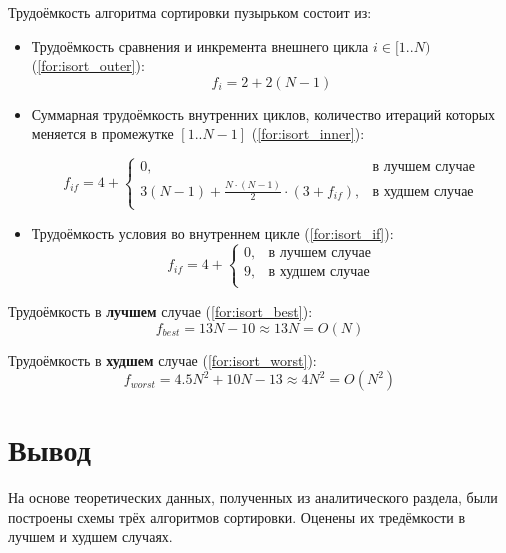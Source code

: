 \documentclass[12pt]{report}
\begin{document}
Трудоёмкость алгоритма сортировки пузырьком состоит из:
\begin{itemize}
	\item Трудоёмкость сравнения и инкремента внешнего цикла $i \in [1..N)$ (\ref{for:isort_outer}):
	\begin{equation}
	\label{for:isort_outer}
	f_{i} = 2 + 2(N - 1)
	\end{equation}
	\item Суммарная трудоёмкость внутренних циклов, количество итераций которых меняется в промежутке $[1..N-1]$ (\ref{for:isort_inner}):

	\begin{equation}
	\label{for:isort_inner}
	f_{if} = 4 + \begin{cases}
		0, & \text{в лучшем случае}\\
		3(N - 1) + \frac{N \cdot (N - 1)}{2} \cdot (3 + f_{if}), & \text{в худшем случае}\\
	\end{cases}
	\end{equation}

	\item Трудоёмкость условия во внутреннем цикле (\ref{for:isort_if}):
	\begin{equation}
	\label{for:isort_if}
	f_{if} = 4 + \begin{cases}
	0, & \text{в лучшем случае}\\
	9, & \text{в худшем случае}\\
	\end{cases}
	\end{equation}
\end{itemize}

Трудоёмкость в \textbf{лучшем} случае (\ref{for:isort_best}):
\begin{equation}
\label{for:isort_best}
f_{best} = 13N - 10 \approx 13N = O(N)
\end{equation}

Трудоёмкость в \textbf{худшем} случае (\ref{for:isort_worst}):
\begin{equation}
\label{for:isort_worst}
f_{worst} = 4.5N^2 + 10N - 13 \approx 4N^2 = O(N^{2})
\end{equation}

\section{Вывод}

На основе теоретических данных, полученных из аналитического раздела, были построены схемы трёх алгоритмов сортировки. Оценены их тредёмкости в лучшем и худшем случаях.
\end{document}
